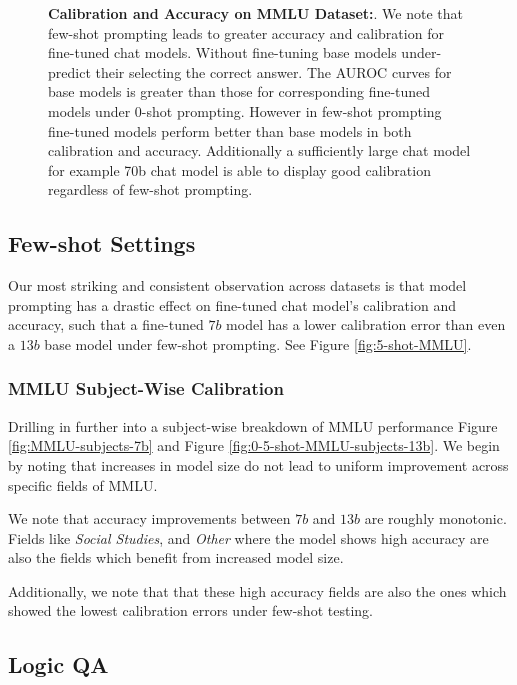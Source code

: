 \documentclass[11pt]{article}
\begin{document}
\begin{figure}
        \caption{\textbf{Calibration and Accuracy on MMLU Dataset:}. We note that few-shot prompting leads to greater accuracy and calibration for fine-tuned chat models. Without fine-tuning base models under-predict their selecting the correct answer. The AUROC curves for base models is greater than those for corresponding fine-tuned models under 0-shot prompting. However in few-shot prompting fine-tuned models perform better than base models in both calibration and accuracy. Additionally a sufficiently large chat model for example 70b chat model is able to display good calibration regardless of few-shot prompting.}
        
        \label{fig:0-5-shot-MMLU}
\end{figure}
\FloatBarrier


\subsection{Few-shot Settings}

Our most striking and consistent observation across datasets is that model prompting has a drastic effect on fine-tuned chat model's calibration and accuracy, such that a fine-tuned $7 b$ model has a lower calibration error than even a $13 b$ base model 
under  few-shot prompting. See Figure \ref{fig:5-shot-MMLU}.


\subsubsection{MMLU Subject-Wise Calibration}

Drilling in further into a subject-wise breakdown of 
MMLU performance  Figure \ref{fig:MMLU-subjects-7b} and 
Figure \ref{fig:0-5-shot-MMLU-subjects-13b}. We begin by noting that increases 
in model size do not lead to uniform improvement across specific 
fields of MMLU. 

We note that accuracy improvements between $7b$ and 
$13b$ are roughly monotonic. Fields like 
\emph{Social Studies}, and \emph{Other} where the 
model shows high accuracy are also the fields which benefit from increased model size.

Additionally, we note that that these high accuracy fields are  also the ones which showed the lowest calibration errors under few-shot testing.

\subsection{Logic QA}
\end{document}
